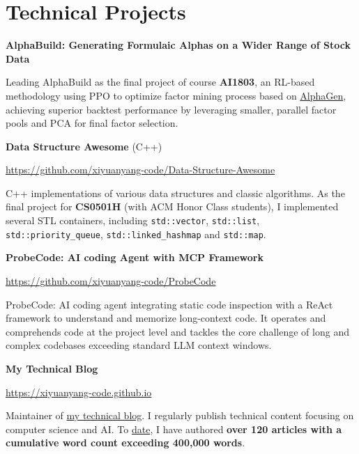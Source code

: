 \documentclass[letterpaper,11pt]{article}
\begin{document}
\section{Technical Projects}

\textbf{AlphaBuild: Generating Formulaic Alphas on a Wider Range of Stock Data}

Leading AlphaBuild as the final project of course \textbf{AI1803}, an RL-based methodology using PPO to optimize factor mining process based on \href{https://github.com/RL-MLDM/alphagen}{AlphaGen}, achieving superior backtest performance by leveraging smaller, parallel factor pools and PCA for final factor selection.
\newline



\textbf{Data Structure Awesome} (C++)

\url{https://github.com/xiyuanyang-code/Data-Structure-Awesome}

C++ implementations of various data structures and classic algorithms. As the final project for \textbf{CS0501H} (with ACM Honor Class students), I implemented several STL containers, including \texttt{std::vector}, \texttt{std::list}, \texttt{std::priority\_queue}, \texttt{std::linked\_hashmap} and \texttt{std::map}.
\newline




\textbf{ProbeCode: AI coding Agent with MCP Framework}

\url{https://github.com/xiyuanyang-code/ProbeCode}

ProbeCode: AI coding agent integrating static code inspection with a ReAct framework to understand and memorize long-context code. It operates and comprehends code at the project level and tackles the core challenge of long and complex codebases exceeding standard LLM context windows.
\newline

\textbf{My Technical Blog}

\url{https://xiyuanyang-code.github.io}

Maintainer of \href{https://xiyuanyang-code.github.io}{my technical blog}. I regularly publish technical content focusing on computer science and AI. To \href{https://xiyuanyang-code.github.io/Blog-word-counting/}{date}, I have authored \textbf{over 120 articles with a cumulative word count exceeding 400,000 words}.
\end{document}
